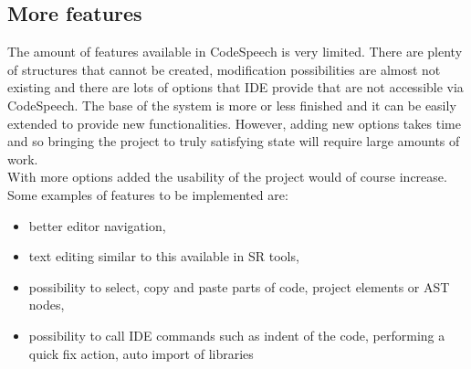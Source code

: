 \subsection{More features}
The amount of features available in CodeSpeech is very limited. There are plenty of structures that cannot be created, modification possibilities are almost not existing and there are lots of options that IDE provide that are not accessible via CodeSpeech. The base of the system is more or less finished and it can be easily extended to provide new functionalities. However, adding new options takes time and so bringing the project to truly satisfying state will require large amounts of work.\\
With more options added the usability of the project would of course increase. Some examples of features to be implemented are:
\begin{itemize}
    \item{better editor navigation,}
    \item{text editing similar to this available in SR tools,}
    \item{possibility to select, copy and paste parts of code, project elements or AST nodes,}
    \item{possibility to call IDE commands such as indent of the code, performing a quick fix action, auto import of libraries \etc}
\end{itemize}


